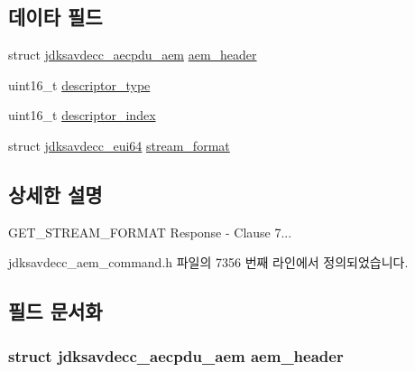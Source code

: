 \subsection*{데이타 필드}
\begin{DoxyCompactItemize}
\item 
struct \hyperlink{structjdksavdecc__aecpdu__aem}{jdksavdecc\+\_\+aecpdu\+\_\+aem} \hyperlink{structjdksavdecc__aem__command__get__stream__format__response_ae1e77ccb75ff5021ad923221eab38294}{aem\+\_\+header}
\item 
uint16\+\_\+t \hyperlink{structjdksavdecc__aem__command__get__stream__format__response_ab7c32b6c7131c13d4ea3b7ee2f09b78d}{descriptor\+\_\+type}
\item 
uint16\+\_\+t \hyperlink{structjdksavdecc__aem__command__get__stream__format__response_a042bbc76d835b82d27c1932431ee38d4}{descriptor\+\_\+index}
\item 
struct \hyperlink{structjdksavdecc__eui64}{jdksavdecc\+\_\+eui64} \hyperlink{structjdksavdecc__aem__command__get__stream__format__response_a77359be54ea386b1da66597746709ed0}{stream\+\_\+format}
\end{DoxyCompactItemize}


\subsection{상세한 설명}
G\+E\+T\+\_\+\+S\+T\+R\+E\+A\+M\+\_\+\+F\+O\+R\+M\+AT Response -\/ Clause 7... 

jdksavdecc\+\_\+aem\+\_\+command.\+h 파일의 7356 번째 라인에서 정의되었습니다.



\subsection{필드 문서화}
\subsubsection[{\texorpdfstring{aem\+\_\+header}{aem_header}}]{\setlength{\rightskip}{0pt plus 5cm}struct {\bf jdksavdecc\+\_\+aecpdu\+\_\+aem} aem\+\_\+header}\hypertarget{structjdksavdecc__aem__command__get__stream__format__response_ae1e77ccb75ff5021ad923221eab38294}{}\label{structjdksavdecc__aem__command__get__stream__format__response_ae1e77ccb75ff5021ad923221eab38294}


